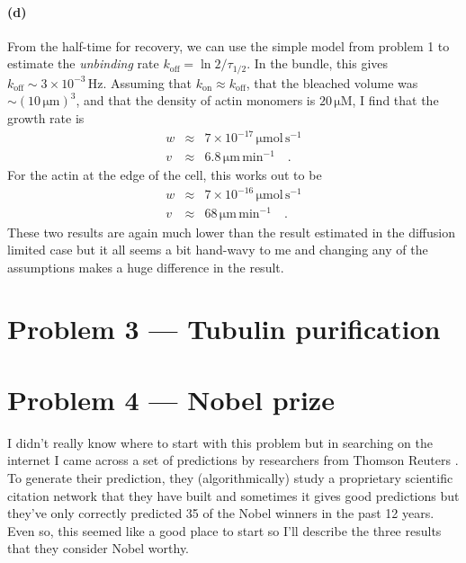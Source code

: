 \documentclass[12pt]{article}
\begin{document}
\paragraph{(d)}

From the half-time for recovery, we can use the simple model from problem 1 to
estimate the \emph{unbinding} rate $k_\mathrm{off} = \ln 2 / \tau_{1/2}$.
In the bundle, this gives $k_\mathrm{off} \sim 3\times 10^{-3} \,\mathrm{Hz}$.
Assuming that $k_\mathrm{on} \approx k_\mathrm{off}$, that the bleached
volume was $\sim (10\,\mathrm{\mu m})^3$, and that the density of actin
monomers is $20\,\mathrm{\mu M}$, I find that the growth rate is
\begin{eqnarray}
w &\approx& 7 \times 10^{-17} \, \mathrm{\mu mol \, s^{-1}} \\
v &\approx& 6.8 \, \mathrm{\mu m\,min^{-1}} \quad.
\end{eqnarray}
For the actin at the edge of the cell, this works out to be
\begin{eqnarray}
w &\approx& 7 \times 10^{-16} \, \mathrm{\mu mol \, s^{-1}} \\
v &\approx& 68 \, \mathrm{\mu m\,min^{-1}} \quad.
\end{eqnarray}
These two results are again much lower than the result estimated in the
diffusion limited case but it all seems a bit hand-wavy to me and changing any
of the assumptions makes a huge difference in the result.


\section{Problem 3 --- Tubulin purification}



\section{Problem 4 --- Nobel prize}

I didn't really know where to start with this problem but in searching on the
internet I came across a set of predictions by researchers from Thomson
Reuters \cite{predict}.
To generate their prediction, they (algorithmically) study a proprietary
scientific citation network that they have built and sometimes it gives good
predictions but they've only correctly predicted 35 of the Nobel winners in
the past 12 years.
Even so, this seemed like a good place to start so I'll describe the three
results that they consider Nobel worthy.
\end{document}

